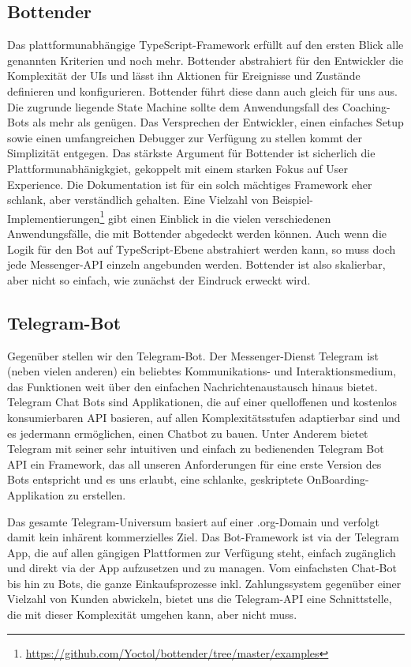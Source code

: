     \subsection{Bottender}
        Das plattformunabhängige TypeScript-Framework erfüllt auf den ersten Blick alle genannten Kriterien und noch mehr. 
        Bottender abstrahiert für den Entwickler die Komplexität der UIs und lässt ihn Aktionen für Ereignisse und Zustände definieren und konfigurieren. Bottender führt diese dann auch gleich für uns aus. Die zugrunde liegende State Machine sollte dem Anwendungsfall des Coaching-Bots als mehr als genügen. Das Versprechen der Entwickler, einen einfaches Setup sowie einen umfangreichen Debugger zur Verfügung zu stellen kommt der Simplizität entgegen. Das stärkste Argument für Bottender ist sicherlich die Plattformunabhänigkgiet, gekoppelt mit einem starken Fokus auf User Experience. Die Dokumentation ist für ein solch mächtiges Framework eher schlank, aber verständlich gehalten. Eine Vielzahl von Beispiel-Implementierungen\footnote{\url{https://github.com/Yoctol/bottender/tree/master/examples}} gibt einen Einblick in die vielen verschiedenen Anwendungsfälle, die mit Bottender abgedeckt werden können. Auch wenn die Logik für den Bot auf TypeScript-Ebene abstrahiert werden kann, so muss doch jede Messenger-API einzeln angebunden werden. Bottender ist also skalierbar, aber nicht so einfach, wie zunächst der Eindruck erweckt wird.


    \subsection{Telegram-Bot}
        Gegenüber stellen wir den Telegram-Bot. Der Messenger-Dienst Telegram ist (neben vielen anderen) ein beliebtes Kommunikations- und Interaktionsmedium, das Funktionen weit über den einfachen Nachrichtenaustausch hinaus bietet. Telegram Chat Bots sind Applikationen, die auf einer quelloffenen und kostenlos konsumierbaren API \cite{telegramAPI} basieren, auf allen Komplexitätsstufen adaptierbar sind und es jedermann ermöglichen, einen Chatbot zu bauen. Unter Anderem bietet Telegram mit seiner sehr intuitiven und einfach zu bedienenden Telegram Bot API ein Framework, das all unseren Anforderungen für eine erste Version des Bots entspricht und es uns erlaubt, eine schlanke, geskriptete OnBoarding-Applikation zu erstellen. 
        
        Das gesamte Telegram-Universum basiert auf einer .org-Domain und verfolgt damit kein inhärent kommerzielles Ziel. Das Bot-Framework ist via der Telegram App, die auf allen gängigen Plattformen zur Verfügung steht, einfach zugänglich und direkt via der App aufzusetzen und zu managen. Vom einfachsten Chat-Bot bis hin zu Bots, die ganze Einkaufsprozesse inkl. Zahlungssystem gegenüber einer Vielzahl von Kunden abwickeln, bietet uns die Telegram-API eine Schnittstelle, die mit dieser Komplexität umgehen kann, aber nicht muss. 
        
